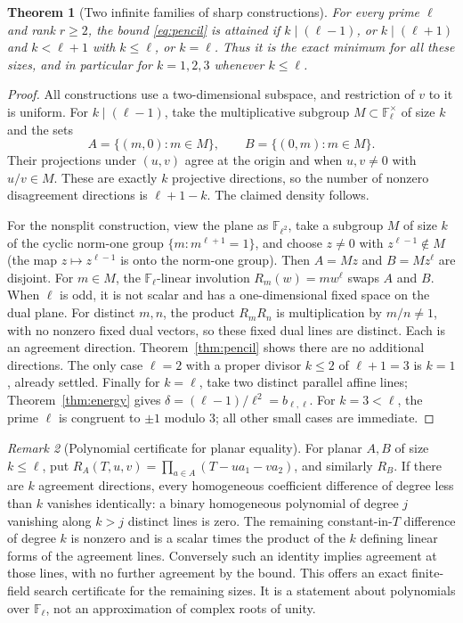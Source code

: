 \documentclass[11pt]{article}
\newtheorem{theorem}{Theorem}[section]
\theoremstyle{remark}\newtheorem{remark}[theorem]{Remark}
\newcommand{\F}{\mathbb F}
\newcommand{\1}{\mathbf 1}
\begin{document}
\begin{theorem}[Two infinite families of sharp constructions]\label{thm:constructions}
For every prime $\ell$ and rank $r\ge2$, the bound \eqref{eq:pencil} is attained if $k\mid(\ell-1)$, or $k\mid(\ell+1)$ and $k<\ell+1$ with $k\le\ell$, or $k=\ell$. Thus it is the exact minimum for all these sizes, and in particular for $k=1,2,3$ whenever $k\le\ell$.
\end{theorem}
\begin{proof}
All constructions use a two-dimensional subspace, and restriction of $v$ to it is uniform. For $k\mid(\ell-1)$, take the multiplicative subgroup $M\subset\F_\ell^\times$ of size $k$ and the sets
\[
 A=\{(m,0):m\in M\},\qquad B=\{(0,m):m\in M\}.
\]
Their projections under $(u,v)$ agree at the origin and when $u,v\ne0$ with $u/v\in M$. These are exactly $k$ projective directions, so the number of nonzero disagreement directions is $\ell+1-k$. The claimed density follows.

For the nonsplit construction, view the plane as $\F_{\ell^2}$, take a subgroup $M$ of size $k$ of the cyclic norm-one group $\{m:m^{\ell+1}=1\}$, and choose $z\ne0$ with $z^{\ell-1}\notin M$ (the map $z\mapsto z^{\ell-1}$ is onto the norm-one group). Then $A=Mz$ and $B=Mz^\ell$ are disjoint. For $m\in M$, the $\F_\ell$-linear involution $R_m(w)=m w^\ell$ swaps $A$ and $B$. When $\ell$ is odd, it is not scalar and has a one-dimensional fixed space on the dual plane. For distinct $m,n$, the product $R_mR_n$ is multiplication by $m/n\ne1$, with no nonzero fixed dual vectors, so these fixed dual lines are distinct. Each is an agreement direction. Theorem~\ref{thm:pencil} shows there are no additional directions. The only case $\ell=2$ with a proper divisor $k\le2$ of $\ell+1=3$ is $k=1$, already settled. Finally for $k=\ell$, take two distinct parallel affine lines; Theorem~\ref{thm:energy} gives $\delta=(\ell-1)/\ell^2=b_{\ell,\ell}$. For $k=3<\ell$, the prime $\ell$ is congruent to $\pm1$ modulo $3$; all other small cases are immediate.
\end{proof}
\begin{remark}[Polynomial certificate for planar equality]
For planar $A,B$ of size $k\le\ell$, put $R_A(T,u,v)=\prod_{a\in A}(T-u a_1-v a_2)$, and similarly $R_B$. If there are $k$ agreement directions, every homogeneous coefficient difference of degree less than $k$ vanishes identically: a binary homogeneous polynomial of degree $j$ vanishing along $k>j$ distinct lines is zero. The remaining constant-in-$T$ difference of degree $k$ is nonzero and is a scalar times the product of the $k$ defining linear forms of the agreement lines. Conversely such an identity implies agreement at those lines, with no further agreement by the bound. This offers an exact finite-field search certificate for the remaining sizes. It is a statement about polynomials over $\F_\ell$, not an approximation of complex roots of unity.
\end{remark}
\end{document}

